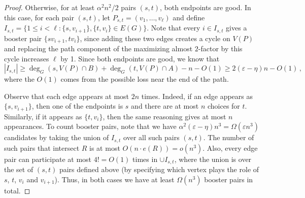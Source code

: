 \documentclass[reqno,final,a4paper]{amsart}
\numberwithin{equation}{section}
\theoremstyle{definition}
\theoremstyle{remark}
\newcommand{\eps}{\varepsilon}
\begin{document}
\begin{proof}
    Otherwise, for at least $\alpha^2n^2/2$ pairs $(s,t)$, both endpoints are good. In this case, for each pair $(s,t)$, let $P_{s,t} = (v_1,\dots, v_\ell)$ and  
    define $I_{s,t} = \{1\leq i<\ell: \{s,v_{i+1}\}, \{t,v_i\}\in E(G)\}$. 
    Note that every $i\in I_{s,t}$ gives a booster pair $\{sv_{i+1}, tv_{i}\}$, since adding these two edges creates a cycle on $V(P)$ and replacing the path component of the maximizing almost $2$-factor by this cycle increases $\ell$ by 1.
    Since both endpoints are good, we know that 
    $$|I_{s,t}|\geq \deg_G(s, V(P)\cap B ) + \deg_G(t, V(P)\cap A) - n - O(1)\geq 2(\eps -\eta)n - O(1)\,,$$
    where the $O(1)$ comes from the possible loss near the end of the path.
    
    Observe that each edge appears at most $2n$ times. Indeed, if an edge appears as $\{s,v_{i+1}\}$, then one of the endpoints is $s$ and there are at most $n$ choices for $t$. Similarly, if it appears as $\{t,v_i\}$, then the same reasoning gives at most $n$ appearances. 
    To count booster pairs, note that we have $\alpha^2 (\eps - \eta)n^3 = \Omega(\eps n^3)$ candidates by taking the union of $I_{s,t}$ over all such pairs $(s,t)$. The number of such pairs that intersect $R$ is at most $O(n\cdot e(R)) = o(n^3)$. 
    Also, every edge pair can participate at most $4! = O(1)$ times in $\cup I_{s,t}$, where the union is over the set of $(s,t)$ pairs defined above (by specifying which vertex plays the role of $s$, $t$, $v_i$ and $v_{i+1}$). 
    Thus, in both cases we have at least $\Omega(n^3)$ booster pairs in total. 
\end{proof}
\end{document}
